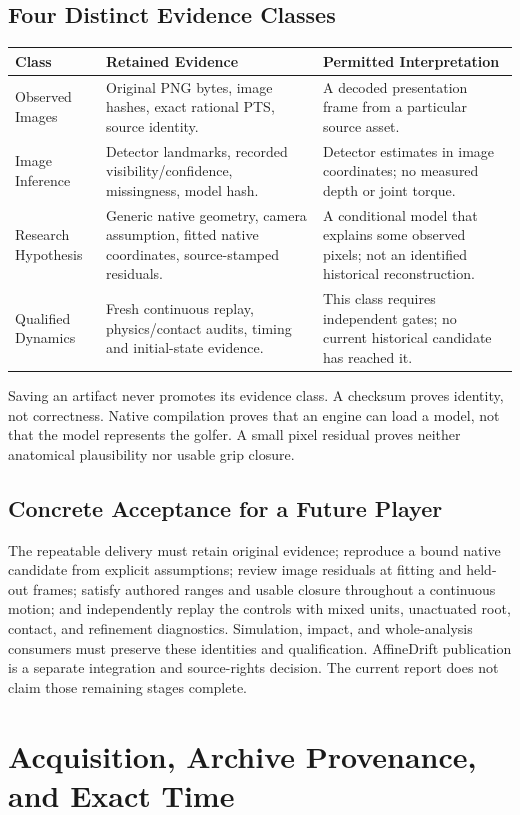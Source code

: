 \documentclass[11pt,letterpaper]{article}
\newcommand{\reportsection}[1]{\section{#1}}
\begin{document}
\subsection{Four Distinct Evidence Classes}
\begin{longtable}{@{}p{1.15in}p{2.4in}p{2.90in}@{}}
\toprule
Class & Retained Evidence & Permitted Interpretation\\\midrule
Observed Images & Original PNG bytes, image hashes, exact rational PTS, source identity. & A decoded presentation frame from a particular source asset.\\
Image Inference & Detector landmarks, recorded visibility/confidence, missingness, model hash. & Detector estimates in image coordinates; no measured depth or joint torque.\\
Research Hypothesis & Generic native geometry, camera assumption, fitted native coordinates, source-stamped residuals. & A conditional model that explains some observed pixels; not an identified historical reconstruction.\\
Qualified Dynamics & Fresh continuous replay, physics/contact audits, timing and initial-state evidence. & This class requires independent gates; no current historical candidate has reached it.\\
\bottomrule
\end{longtable}
Saving an artifact never promotes its evidence class. A checksum proves identity,
not correctness. Native compilation proves that an engine can load a model,
not that the model represents the golfer. A small pixel residual proves neither
anatomical plausibility nor usable grip closure.

\subsection{Concrete Acceptance for a Future Player}
The repeatable delivery must retain original evidence; reproduce a bound native
candidate from explicit assumptions; review image residuals at fitting and
held-out frames; satisfy authored ranges and usable closure throughout a
continuous motion; and independently replay the controls with mixed units,
unactuated root, contact, and refinement diagnostics. Simulation, impact, and
whole-analysis consumers must preserve these identities and qualification.
AffineDrift publication is a separate integration and source-rights decision.
The current report does not claim those remaining stages complete.

\reportsection{Acquisition, Archive Provenance, and Exact Time}
\end{document}
